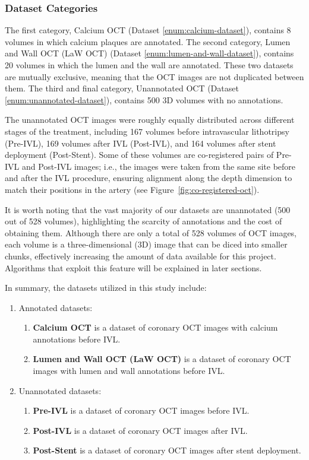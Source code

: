 \documentclass[a4paper,11pt,oneside]{report}
\begin{document}
\subsubsection{Dataset Categories}

The first category, Calcium OCT (Dataset \ref{enum:calcium-dataset}), contains 8 volumes in which calcium plaques are annotated. The second category, Lumen and Wall OCT (LaW OCT) (Dataset \ref{enum:lumen-and-wall-dataset}), contains 20 volumes in which the lumen and the wall are annotated. These two datasets are mutually exclusive, meaning that the OCT images are not duplicated between them. The third and final category, Unannotated OCT (Dataset \ref{enum:unannotated-dataset}), contains 500 3D volumes with no annotations. 

The unannotated OCT images were roughly equally distributed across different stages of the treatment, including 167 volumes before intravascular lithotripsy (Pre-IVL), 169 volumes after IVL (Post-IVL), and 164 volumes after stent deployment (Post-Stent). Some of these volumes are co-registered pairs of Pre-IVL and Post-IVL images; i.e., the images were taken from the same site before and after the IVL procedure, ensuring alignment along the depth dimension to match their positions in the artery (see Figure~\ref{fig:co-registered-oct}). 

It is worth noting that the vast majority of our datasets are unannotated (500 out of 528 volumes), highlighting the scarcity of annotations and the cost of obtaining them. Although there are only a total of 528 volumes of OCT images, each volume is a three-dimensional (3D) image that can be diced into smaller chunks, effectively increasing the amount of data available for this project. Algorithms that exploit this feature will be explained in later sections.

In summary, the datasets utilized in this study include:

\begin{enumerate}
    \item Annotated datasets:
    \begin{enumerate}
        \item \label{enum:calcium-dataset} \textbf{Calcium OCT} is a dataset of coronary OCT images with calcium annotations before IVL.
        \item \label{enum:lumen-and-wall-dataset} \textbf{Lumen and Wall OCT (LaW OCT)} is a dataset of coronary OCT images with lumen and wall annotations before IVL.
    \end{enumerate}
    \item \label{enum:unannotated-dataset} Unannotated datasets:
    \begin{enumerate}
        \item \textbf{Pre-IVL} is a dataset of coronary OCT images before IVL.
        \item \textbf{Post-IVL} is a dataset of coronary OCT images after IVL.
        \item \textbf{Post-Stent} is a dataset of coronary OCT images after stent deployment.
    \end{enumerate}
\end{enumerate}
\end{document}
